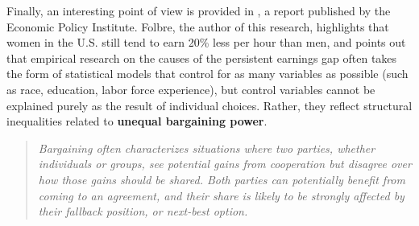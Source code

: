 Finally, an interesting point of view is provided in \cite{folbre2021gender}, a report published by the Economic Policy Institute. Folbre, the author of this research, highlights that women in the U.S. still tend to earn 20\% less per hour than men, and points out that empirical research on the causes of the persistent earnings gap often takes the form of statistical models that control for as many variables as possible (such as race, education, labor force experience), but control variables cannot be explained purely as the result of individual choices. Rather, they reflect structural inequalities related to \textbf{unequal bargaining power}.
\begin{quote}\emph{Bargaining often characterizes situations where two parties, whether individuals or groups, see potential gains from cooperation but disagree over how those gains should be shared. Both parties can potentially benefit from coming to an agreement, and their share is likely to be strongly affected by their fallback position, or next-best option.} \cite[p.~9]{folbre2021gender}\end{quote}

